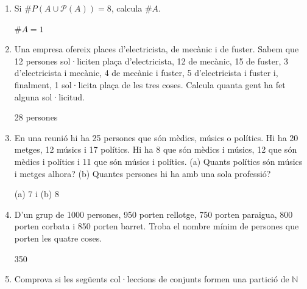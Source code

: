 \begin{enumerate}
\begin{indicacio}
a) $U$, b) $A$, c) $A\cap (B\cup C)$ i d) $A\cup C$
\end{indicacio}

\item
\begin{exercici}
Si $\#P\left( A\cup \mathcal{P}(A)\right) =8$, calcula $\#A$.
\end{exercici}

\begin{indicacio}
$\#A=1$
\end{indicacio}

\item
\begin{exercici}
Una empresa ofereix places d'electricista, de mecànic i de fuster.
Sabem que 12 persones sol·liciten plaça
d'electricista, 12 de mecànic, 15 de fuster, 3 d'electricista i mecànic, 4 de mecànic i fuster, 5 d'electricista i fuster i, finalment, 1 sol·licita plaça de les tres coses. Calcula quanta
gent ha fet alguna sol·licitud.
\end{exercici}

\begin{indicacio}
28 persones
\end{indicacio}

\item
\begin{exercici}
En una reunió hi ha 25 persones que són mèdics, músics
o polítics. Hi ha 20 metges, 12 músics i 17 polítics. Hi ha 8
que són mèdics i músics, 12 que són mèdics i polítics i 11 que són músics i polítics. (a) Quants polítics són músics i metges alhora? (b) Quantes persones hi ha amb una sola
professió?
\end{exercici}

\begin{indicacio}
(a) 7 i (b) 8
\end{indicacio}

\item
\begin{exercici}
D'un grup de 1000 persones, 950 porten rellotge, 750 porten paraigua,
800 porten corbata i 850 porten barret. Troba el nombre mínim de
persones que porten les quatre coses.
\end{exercici}

\begin{indicacio}
350
\end{indicacio}

\item
\begin{exercici}
Comprova si les següents col·leccions de
conjunts formen una partició de $\mathbb{N}$


\end{exercici}
\end{enumerate}
